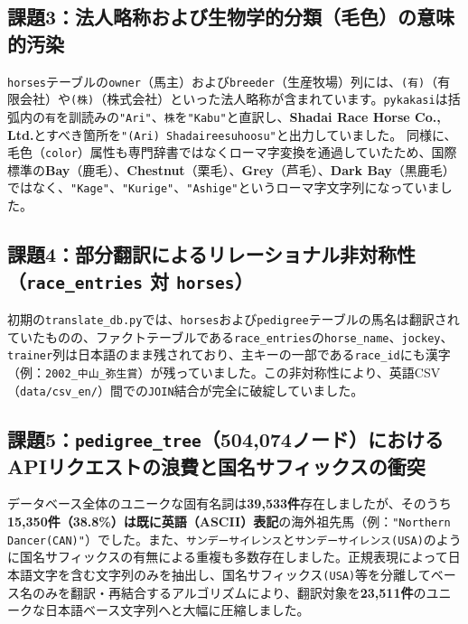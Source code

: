 \documentclass[12pt,a4paper]{article}
\begin{document}
\subsection{課題3：法人略称および生物学的分類（毛色）の意味的汚染}
\texttt{horses}テーブルの\texttt{owner}（馬主）および\texttt{breeder}（生産牧場）列には、\texttt{(有)}（有限会社）や\texttt{(株)}（株式会社）といった法人略称が含まれています。\texttt{pykakasi}は括弧内の\texttt{有}を訓読みの\texttt{"Ari"}、\texttt{株}を\texttt{"Kabu"}と直訳し、\textbf{Shadai Race Horse Co., Ltd.}とすべき箇所を\texttt{"(Ari) Shadaireesuhoosu"}と出力していました。
同様に、毛色（\texttt{color}）属性も専門辞書ではなくローマ字変換を通過していたため、国際標準の\textbf{Bay}（鹿毛）、\textbf{Chestnut}（栗毛）、\textbf{Grey}（芦毛）、\textbf{Dark Bay}（黒鹿毛）ではなく、\texttt{"Kage"}、\texttt{"Kurige"}、\texttt{"Ashige"}というローマ字文字列になっていました。

\subsection{課題4：部分翻訳によるリレーショナル非対称性（\texttt{race\_entries} 対 \texttt{horses}）}
初期の\texttt{translate\_db.py}では、\texttt{horses}および\texttt{pedigree}テーブルの馬名は翻訳されていたものの、ファクトテーブルである\texttt{race\_entries}の\texttt{horse\_name}、\texttt{jockey}、\texttt{trainer}列は日本語のまま残されており、主キーの一部である\texttt{race\_id}にも漢字（例：\texttt{2002\_中山\_弥生賞}）が残っていました。この非対称性により、英語CSV（\texttt{data/csv\_en/}）間での\texttt{JOIN}結合が完全に破綻していました。

\subsection{課題5：\texttt{pedigree\_tree}（504,074ノード）におけるAPIリクエストの浪費と国名サフィックスの衝突}
データベース全体のユニークな固有名詞は\textbf{39,533件}存在しましたが、そのうち\textbf{15,350件（38.8\%）は既に英語（ASCII）表記}の海外祖先馬（例：\texttt{"Northern Dancer(CAN)"}）でした。また、\texttt{サンデーサイレンス}と\texttt{サンデーサイレンス(USA)}のように国名サフィックスの有無による重複も多数存在しました。正規表現によって日本語文字を含む文字列のみを抽出し、国名サフィックス\texttt{(USA)}等を分離してベース名のみを翻訳・再結合するアルゴリズムにより、翻訳対象を\textbf{23,511件}のユニークな日本語ベース文字列へと大幅に圧縮しました。
\end{document}
